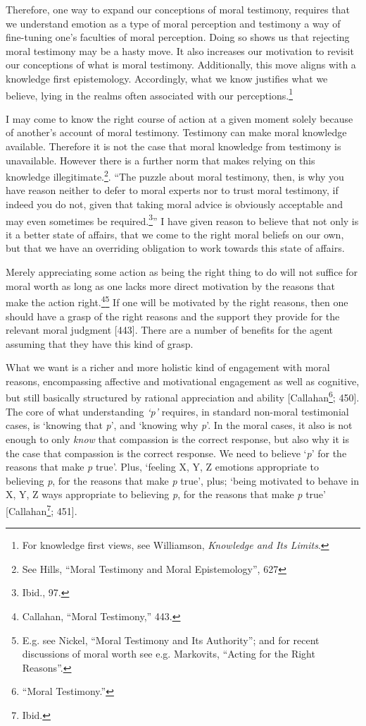 \documentclass[phdthesis,12pt,final]{wuthesis}
\theoremstyle{definition}
\theoremstyle{definition}
\theoremstyle{definition}
\theoremstyle{definition}
\theoremstyle{remark}
\begin{document}
Therefore, one way to expand our conceptions of moral testimony, requires that we understand emotion as a type of moral perception and testimony a way of fine-tuning one's faculties of moral perception. Doing so shows us that rejecting moral testimony may be a hasty move. It also increases our motivation to revisit our conceptions of what is moral testimony. Additionally, this move aligns with a knowledge first epistemology. Accordingly, what we know justifies what we believe, lying in the realms often associated with our perceptions.\footnote{For knowledge first views, see Williamson, \emph{Knowledge and {Its Limits}}.}

I may come to know the right course of action at a given moment solely because of another's account of moral testimony. Testimony can make moral knowledge available. Therefore it is not the case that moral knowledge from testimony is unavailable. However there is a further norm that makes relying on this knowledge illegitimate.\footnote{See Hills, {``Moral Testimony and Moral Epistemology''}, 627}. ``The puzzle about moral testimony, then, is why you have reason neither to defer to moral experts nor to trust moral testimony, if indeed you do not, given that taking moral advice is obviously acceptable and may even sometimes be required.\footnote{Ibid., 97.}'' I have given reason to believe that not only is it a better state of affairs, that we come to the right moral beliefs on our own, but that we have an overriding obligation to work towards this state of affairs.

Merely appreciating some action as being the right thing to do will not suffice for moral worth as long as one lacks more direct motivation by the reasons that make the action right.\footnote{Callahan, {``Moral {Testimony},''} 443.}\footnote{E.g. see Nickel, {``Moral {Testimony} and Its {Authority}''}; and for recent discussions of moral worth see e.g. Markovits, {``Acting for the {Right Reasons}''}.} If one will be motivated by the right reasons, then one should have a grasp of the right reasons and the support they provide for the relevant moral judgment {[}443{]}. There are a number of benefits for the agent assuming that they have this kind of grasp.

What we want is a richer and more holistic kind of engagement with moral reasons, encompassing affective and motivational engagement as well as cognitive, but still basically structured by rational appreciation and ability {[}Callahan\footnote{{``Moral {Testimony}.''}}; 450{]}. The core of what understanding \emph{`p'} requires, in standard non-moral testimonial cases, is `knowing that \emph{p}', and `knowing why \emph{p}'. In the moral cases, it also is not enough to only \emph{know} that compassion is the correct response, but also why it is the case that compassion is the correct response. We need to believe `\emph{p}' for the reasons that make \emph{p} true'. Plus, `feeling X, Y, Z emotions appropriate to believing \emph{p}, for the reasons that make \emph{p} true', plus; `being motivated to behave in X, Y, Z ways appropriate to believing \emph{p}, for the reasons that make \emph{p} true' {[}Callahan\footnote{Ibid.}; 451{]}.
\end{document}

